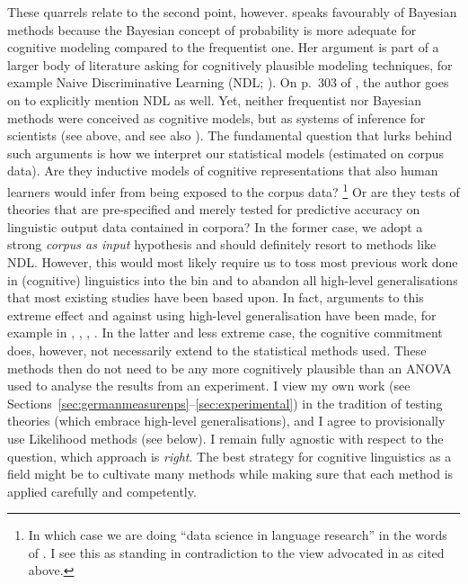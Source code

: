 \documentclass[USenglish]{article}
\begin{document}
These quarrels relate to the second point, however.
\citet[301--302]{Divjak2016a} speaks favourably of Bayesian methods because the Bayesian concept of probability is more adequate for cognitive modeling compared to the frequentist one.
Her argument is part of a larger body of literature asking for cognitively plausible modeling techniques, for example Naive Discriminative Learning (NDL; \citealp{Baayen2011,BaayenEa2013,MilinEa2016,TheijssenEa2013}). 
On p.\ 303 of \cite{Divjak2016a}, the author goes on to explicitly mention NDL as well.
Yet, neither frequentist nor Bayesian methods were conceived as cognitive models, but as systems of inference for scientists (see above, and see also \citealp[302]{Divjak2016a}).
The fundamental question that lurks behind such arguments is how we interpret our statistical models (estimated on corpus data).
Are they inductive models of cognitive representations that also human learners would infer from being exposed to the corpus data?%
\footnote{In which case we are doing ``data science in language research'' in the words of \citealp{MilinEa2016}.
I see this as standing in contradiction to the view advocated in \cite{Dabrowska2016} as cited above.}
Or are they tests of theories that are pre-specified and merely tested for predictive accuracy on linguistic output data contained in corpora?
In the former case, we adopt a strong \textit{corpus as input} hypothesis and should definitely resort to methods like NDL.
However, this would most likely require us to toss most previous work done in (cognitive) linguistics into the bin and to abandon all high-level generalisations that most existing studies have been based upon.
In fact, arguments to this extreme effect and against using high-level generalisation have been made, for example in \cite{BaayenEa2016}, \citet[299--300]{Divjak2016a}, \cite{RamscarPort2016}, \cite{TheijssenEa2013}.
In the latter and less extreme case, the cognitive commitment does, however, not necessarily extend to the statistical methods used.
These methods then do not need to be any more cognitively plausible than an ANOVA used to analyse the results from an experiment.
I view my own work (see Sections~\ref{sec:germanmeasurenps}--\ref{sec:experimental}) in the tradition of testing theories (which embrace high-level generalisations), and I agree to provisionally use Likelihood methods (see below).
I remain fully agnostic with respect to the question, which approach is \textit{right}.
The best strategy for cognitive linguistics as a field might be to cultivate many methods while making sure that each method is applied carefully and competently.
\end{document}
